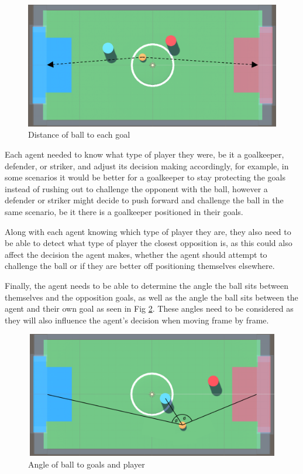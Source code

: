 \begin{figure}[h]
    \centering
    \includegraphics[width=115mm, height=55mm]{img/Image3.png}
    \caption{Distance of ball to each goal}
    \label{fig:sd3}
\end{figure}

\begin{flushleft}
Each agent needed to know what type of player they were, be it a goalkeeper, defender, or striker, and adjust its decision making accordingly, for example, in some scenarios it would be better for a goalkeeper to stay protecting the goals instead of rushing out to challenge the opponent with the ball, however a defender or striker might decide to push forward and challenge the ball in the same scenario, be it there is a goalkeeper positioned in their goals.

Along with each agent knowing which type of player they are, they also need to be able to detect what type of player the closest opposition is, as this could also affect the decision the agent makes, whether the agent should attempt to challenge the ball or if they are better off positioning themselves elsewhere.

Finally, the agent needs to be able to determine the angle the ball sits between themselves and the opposition goals, as well as the angle the ball sits between the agent and their own goal as seen in Fig \ref{fig:sd4}. These angles need to be considered as they will also influence the agent’s decision when moving frame by frame.
\end{flushleft}

\begin{figure}[H]
    \centering
    \includegraphics[width=115mm, height=55mm]{img/Image5.png}
    \caption{Angle of ball to goals and player}
    \label{fig:sd4}
\end{figure}

